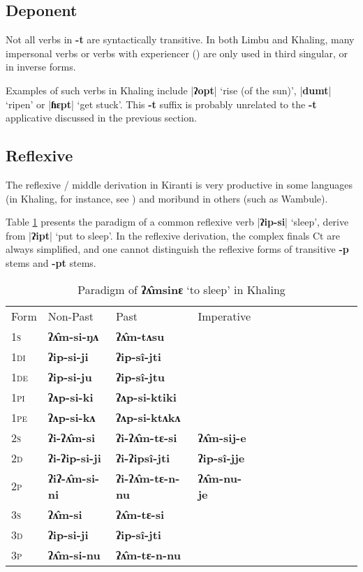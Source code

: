 \documentclass[oneside,a4paper,11pt]{article}
\newcommand{\ipa}[1]{\textbf{{\phon\mbox{#1}}}} %
\newcommand{\grise}[1]{\cellcolor{lightgray}\textbf{#1}}
\newcommand{\dhatu}[2]{|\ipa{#1}| `#2'}
\begin{document}
\subsection{Deponent} \label{sec:deponent}
Not all verbs in \ipa{-t} are syntactically transitive. In both Limbu and Khaling, many impersonal verbs or verbs with experiencer (\citealt{michailovsky97deponent}) are only used in third singular, or in inverse forms.  

Examples of such verbs in Khaling include \dhatu{ʔopt}{rise (of the sun)},  \dhatu{dumt}{ripen} or \dhatu{ɦɛpt}{get stuck}. This \ipa{-t} suffix is probably unrelated to the \ipa{-t} applicative discussed in the previous section. 

\subsection{Reflexive} \label{sec:refl}
The reflexive / middle derivation in Kiranti is very productive in some languages (in Khaling, for instance, see \citealt{jacques16si}) and moribund in others (such as Wambule). 


Table \ref{tab:ip.vr} presents the paradigm of a common reflexive verb \dhatu{ʔip-si}{sleep}, derive from \dhatu{ʔipt}{put to sleep}. In the reflexive derivation, the complex finals Ct are always simplified, and one cannot distinguish the reflexive forms of transitive \ipa{-p} stems and \ipa{-pt} stems.

\begin{table}[h]
\label{tab:ip.vr} \centering 
\caption{Paradigm of \ipa{ʔʌ̂msinɛ}  `to sleep' in Khaling }
\begin{tabular}{l|l|l|l|l|l|l|l|l|l|l|l|l} 
\toprule
Form& Non-Past & Past & Imperative \\
\textsc{1s} & \ipa{ʔʌ̂m-si-ŋʌ}  \grise{}& \ipa{ʔʌ̂m-tʌsu} \grise{}&\\ 
\textsc{1di} &\ipa{ʔip-si-ji}  & \ipa{ʔip-sî-jti}  & \\
\textsc{1de} &\ipa{ʔip-si-ju}  & \ipa{ʔip-sî-jtu}  & \\ 
\textsc{1pi} &\ipa{ʔʌp-si-ki}  & \ipa{ʔʌp-si-ktiki} & \\ 
\textsc{1pe} &\ipa{ʔʌp-si-kʌ}  & \ipa{ʔʌp-si-ktʌkʌ} &  \\ 
\textsc{2s} & \ipa{ʔi-ʔʌ̂m-si}  \grise{}& \ipa{ʔi-ʔʌ̂m-tɛ-si} \grise{} & \ipa{ʔʌ̂m-sij-e}  \grise{}\\ 
\textsc{2d} & \ipa{ʔi-ʔip-si-ji}  & \ipa{ʔi-ʔipsî-jti}  & \ipa{ʔip-sî-jje}    \\
\textsc{2p} & \ipa{ʔiʔ-ʌ̂m-si-ni} \grise{} & \ipa{ʔi-ʔʌ̂m-tɛ-n-nu} \grise{} & \ipa{ʔʌ̂m-nu-je}  \grise{}\\ 
\textsc{3s} & \ipa{ʔʌ̂m-si}  \grise{}& \ipa{ʔʌ̂m-tɛ-si}  \grise{} &\\ 
\textsc{3d} & \ipa{ʔip-si-ji}  & \ipa{ʔip-sî-jti} &  \\ 
\textsc{3p} & \ipa{ʔʌ̂m-si-nu}\grise{}  & \ipa{ʔʌ̂m-tɛ-n-nu} \grise{}&\\ 
\bottomrule
\end{tabular}
\end{table}
\end{document}
